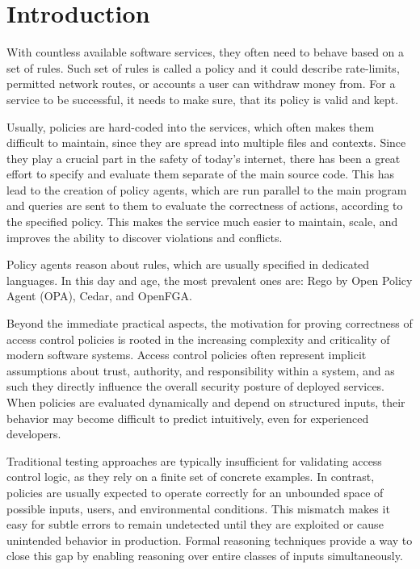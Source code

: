 \chapter{Introduction}
\label{ch:intro}


With countless available software services, they often need to behave based on a set of rules.
Such set of rules is called a policy and it could describe rate-limits, permitted network routes, or accounts a user can withdraw money from.
For a service to be successful, it needs to make sure, that its policy is valid and kept.

Usually, policies are hard-coded into the services, which often makes them difficult to maintain, since they are spread into multiple files and contexts.
Since they play a crucial part in the safety of today's internet, there has been a great effort to specify and evaluate them separate of the main source code.
This has lead to the creation of policy agents, which are run parallel to the main program and queries are sent to them to evaluate the correctness of actions, according to the specified policy.
This makes the service much easier to maintain, scale, and improves the ability to discover violations and conflicts.

Policy agents reason about rules, which are usually specified in dedicated languages.
In this day and age, the most prevalent ones are: Rego by Open Policy Agent (OPA), Cedar, and OpenFGA.

Beyond the immediate practical aspects, the motivation for proving correctness of access control policies is rooted in the increasing complexity and criticality of modern software systems.
Access control policies often represent implicit assumptions about trust, authority, and responsibility within a system, and as such they directly influence the overall security posture of deployed services.
When policies are evaluated dynamically and depend on structured inputs, their behavior may become difficult to predict intuitively, even for experienced developers.

Traditional testing approaches are typically insufficient for validating access control logic, as they rely on a finite set of concrete examples.
In contrast, policies are usually expected to operate correctly for an unbounded space of possible inputs, users, and environmental conditions.
This mismatch makes it easy for subtle errors to remain undetected until they are exploited or cause unintended behavior in production.
Formal reasoning techniques provide a way to close this gap by enabling reasoning over entire classes of inputs simultaneously.

